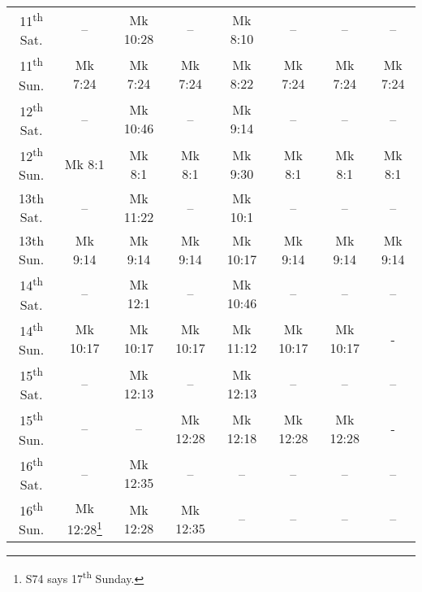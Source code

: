 \begin{tabular}{ c c c c c c c c }
 11\textsuperscript{th} Sat. & -- & Mk 10:28 & -- & Mk 8:10 & -- & -- & -- \\
 11\textsuperscript{th} Sun. & Mk 7:24 & Mk 7:24 & Mk 7:24 & Mk 8:22 & Mk 7:24 & Mk 7:24 & Mk 7:24 \\
 12\textsuperscript{th} Sat. & -- & Mk 10:46 & -- & Mk 9:14 & -- & -- & -- \\
 12\textsuperscript{th} Sun. & Mk 8:1 & Mk 8:1 & Mk 8:1 & Mk 9:30 & Mk 8:1 & Mk 8:1 & Mk 8:1 \\
 13th Sat. & -- & Mk 11:22 & -- & Mk 10:1 & -- & -- & -- \\
 13th Sun. & Mk 9:14 & Mk 9:14 & Mk 9:14 & Mk 10:17 & Mk 9:14 & Mk 9:14 & Mk 9:14 \\
 14\textsuperscript{th} Sat. & -- & Mk 12:1 & -- & Mk 10:46 & -- & -- & -- \\
 14\textsuperscript{th} Sun. & Mk 10:17 & Mk 10:17 & Mk 10:17 & Mk 11:12 & Mk 10:17 & Mk 10:17 & - \\
 15\textsuperscript{th} Sat. & -- & Mk 12:13 & -- & Mk 12:13 & -- & -- & -- \\
 15\textsuperscript{th} Sun. & -- & -- & Mk 12:28 & Mk 12:18 & Mk 12:28 & Mk 12:28 & - \\
 16\textsuperscript{th} Sat. & -- & Mk 12:35 & -- & -- & -- & -- & -- \\
 16\textsuperscript{th} Sun. & Mk 12:28\footnote{S74 says 17\textsuperscript{th} Sunday.} & Mk 12:28 & Mk 12:35 & -- & -- & -- & -- \\
\bottomrule

\end{tabular}
